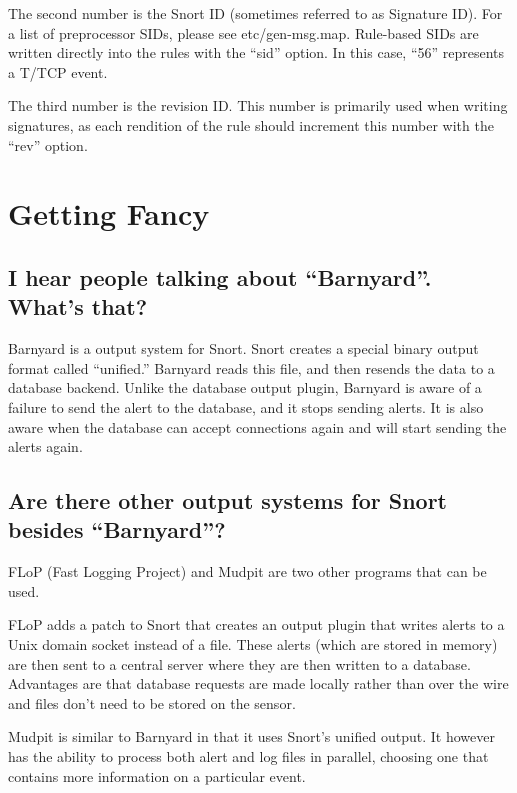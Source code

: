 \documentclass{article}
\begin{document}
The second number is the Snort ID (sometimes referred to as Signature
ID). For a list of preprocessor SIDs, please see etc/gen-msg.map.
Rule-based SIDs are written directly into the rules with the ``sid''
option. In this case, ``56'' represents a T/TCP event.

The third number is the revision ID. This number is primarily used when
writing signatures, as each rendition of the rule should increment this
number with the ``rev'' option.


\section{Getting Fancy}

\subsection{I hear people talking about ``Barnyard''. What's that?\label{barnyard}}

Barnyard is a output system for Snort. Snort creates a special binary output
format called ``unified.'' Barnyard reads this file, and then resends the data
to a database backend. Unlike the database output plugin, Barnyard is aware of
a failure to send the alert to the database, and it stops sending alerts. It is
also aware when the database can accept connections again and will start
sending the alerts again.

\subsection{Are there other output systems for Snort besides ``Barnyard''?\label{spoolers}}

FLoP (Fast Logging Project) and Mudpit are two other programs that can be used.

FLoP adds a patch to Snort that creates an output plugin that writes alerts to
a Unix domain socket instead of a file. These alerts (which are stored in memory)
are then sent to a central server where they are then written to a database.
Advantages are that database requests are made locally rather than over
the wire and files don't need to be stored on the sensor. 


Mudpit is similar to Barnyard in that it uses Snort's unified output. It however 
has the ability to process both alert and log files in parallel, choosing one
that contains more information on a particular event.
\end{document}
